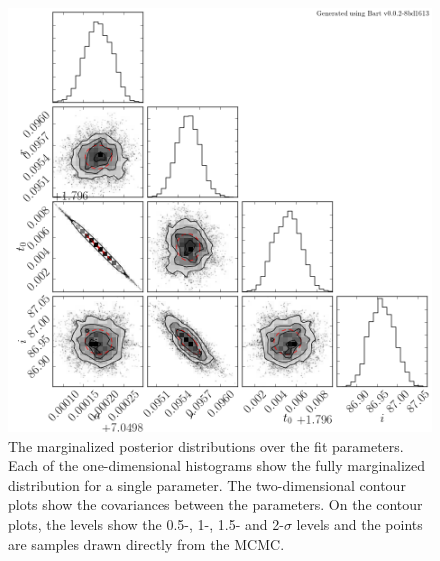 \documentclass[12pt,preprint]{aastex}
\newcommand{\figlabel}[1]{\label{fig:#1}}
\begin{document}
\begin{figure}[htbp]
    \begin{center}
        \includegraphics[width=\textwidth]{figures/k6-corner.png}
    \end{center}
    \caption{The marginalized posterior distributions over the fit parameters.
        Each of the one-dimensional histograms show the fully marginalized
        distribution for a single parameter. The two-dimensional contour plots
        show the covariances between the parameters. On the contour plots, the
        levels show the 0.5-, 1-, 1.5- and 2-$\sigma$ levels and the points
        are samples drawn directly from the MCMC. \figlabel{k6-corner}}
\end{figure}
\end{document}

